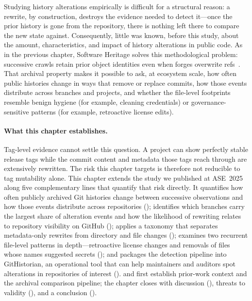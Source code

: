Studying history alterations empirically is difficult for a structural reason: a rewrite, by construction, destroys the evidence needed to detect it---once the prior history is gone from the repository, there is nothing left there to compare the new state against.
Consequently, little was known, before this study, about the amount, characteristics, and impact of history alterations in public code.
As in the previous chapter, Software Heritage solves this methodological problem: successive crawls retain prior object identities even when forges overwrite refs~\cite{swhcacm2018,cise-2020-doi}.
That archival property makes it possible to ask, at ecosystem scale, how often public histories change in ways that remove or replace commits, how those events distribute across branches and projects, and whether the file-level footprints resemble benign hygiene (for example, cleaning credentials) or governance-sensitive patterns (for example, retroactive license edits).

\paragraph{What this chapter establishes.}
Tag-level evidence cannot settle this question.
A project can show perfectly stable release tags while the commit content and metadata those tags reach through are extensively rewritten.
The risk this chapter targets is therefore not reducible to tag mutability alone.
This chapter extends the study we published at ASE~2025~\cite{DBLP:conf/kbse/RapaportPTZ25} along five complementary lines that quantify that risk directly.
It quantifies how often publicly archived Git histories change between successive observations and how those events distribute across repositories (); identifies which branches carry the largest share of alteration events and how the likelihood of rewriting relates to repository visibility on GitHub (); applies a taxonomy that separates metadata-only rewrites from directory and file changes (); examines two recurrent file-level patterns in depth---retroactive license changes and removals of files whose names suggested secrets (); and packages the detection pipeline into GitHistorian, an operational tool that can help maintainers and auditors spot alterations in repositories of interest ().
 and  first establish prior-work context and the archival comparison pipeline; the chapter closes with discussion (), threats to validity (), and a conclusion ().

